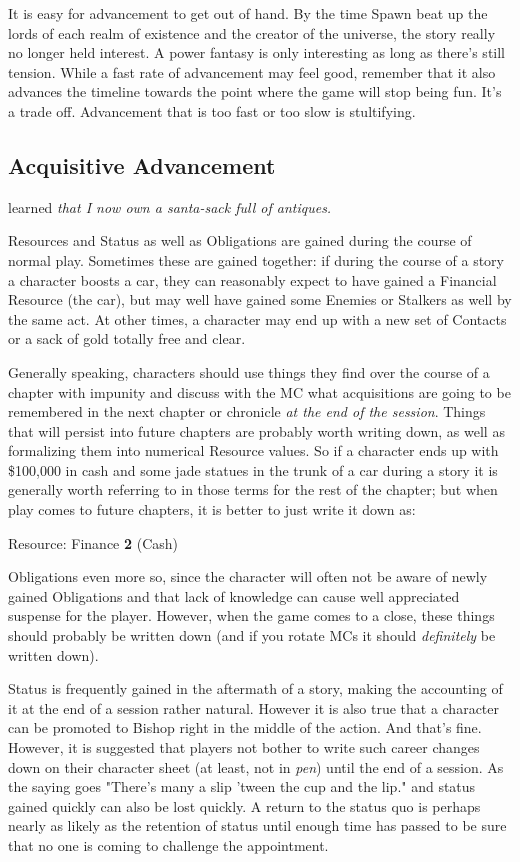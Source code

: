 It is easy for advancement to get out of hand. By the time Spawn beat up the lords of each realm of existence and the creator of the universe, the story really no longer held interest. A power fantasy is only interesting as long as there's still tension. While a fast rate of advancement may feel good, remember that it also advances the timeline towards the point where the game will stop being fun. It's a trade off. Advancement that is too fast or too slow is stultifying.

\subsection{Acquisitive Advancement}
learned\textit{ that I now own a santa-sack full of antiques.}

Resources and Status as well as Obligations are gained during the course of normal play. Sometimes these are gained together: if during the course of a story a character boosts a car, they can reasonably expect to have gained a Financial Resource (the car), but may well have gained some Enemies or Stalkers as well by the same act. At other times, a character may end up with a new set of Contacts or a sack of gold totally free and clear.

Generally speaking, characters should use things they find over the course of a chapter with impunity and discuss with the MC what acquisitions are going to be remembered in the next chapter or chronicle \textit{at the end of the session}. Things that will persist into future chapters are probably worth writing down, as well as formalizing them into numerical Resource values. So if a character ends up with \$100,000 in cash and some jade statues in the trunk of a car during a story it is generally worth referring to in those terms for the rest of the chapter; but when play comes to future chapters, it is better to just write it down as:

Resource: Finance \textbf{2} (Cash)

Obligations even more so, since the character will often not be aware of newly gained Obligations and that lack of knowledge can cause well appreciated suspense for the player. However, when the game comes to a close, these things should probably be written down (and if you rotate MCs it should \textit{definitely} be written down).

Status is frequently gained in the aftermath of a story, making the accounting of it at the end of a session rather natural. However it is also true that a character can be promoted to Bishop right in the middle of the action. And that's fine. However, it is suggested that players not bother to write such career changes down on their character sheet (at least, not in \textit{pen}) until the end of a session. As the saying goes "There's many a slip 'tween the cup and the lip." and status gained quickly can also be lost quickly. A return to the status quo is perhaps nearly as likely as the retention of status until enough time has passed to be sure that no one is coming to challenge the appointment.

